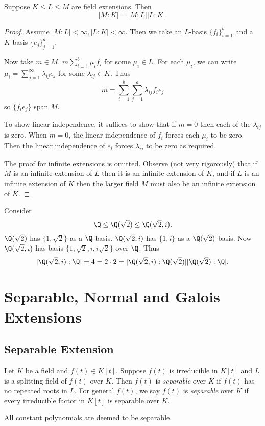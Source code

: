 \documentclass[a4paper]{article}
\begin{document}
\begin{theorem}
  Suppose \(K \leq L \leq M\) are field extensions. Then
  \[
    |M:K| = |M:L||L:K|.
  \]
\end{theorem}

\begin{proof}
  Assume \(|M:L| < \infty, |L:K| < \infty\). Then we take an \(L\)-basis \(\{f_i\}_{i = 1}^b\) and a \(K\)-basis \(\{e_j\}_{j = 1}^a\).

  Now take \(m \in M\). \(m \sum_{i = 1}^{b} \mu_if_i\) for some \(\mu_i \in L\). For each \(\mu_i\), we can write \(\mu_i = \sum_{j = 1}^{\infty} \lambda_{ij}e_j\) for some \(\lambda_{ij} \in K\). Thus
  \[
    m = \sum_{i = 1}^{b} \sum_{j = 1}^{a} \lambda_{ij} f_ie_j
  \]
  so \(\{f_ie_j\}\) span \(M\).

  To show linear independence, it suffices to show that if \(m = 0\) then each of the \(\lambda_{ij}\) is zero. When \(m = 0\), the linear independence of \(f_i\) forces each \(\mu_i\) to be zero. Then the linear independence of \(e_i\) forces \(\lambda_{ij}\) to be zero as required.

  The proof for infinite extensions is omitted. Observe (not very rigorously) that if \(M\) is an infinite extension of \(L\) then it is an infinite extension of \(K\), and if \(L\) is an infinite extension of \(K\) then the larger field \(M\) must also be an infinite extension of \(K\).
\end{proof}

\begin{eg}
  Consider
  \[
    \Q \leq \Q(\sqrt 2) \leq \Q(\sqrt 2, i).
  \]
  \(\Q(\sqrt 2)\) has \(\{1, \sqrt 2\}\) as a \(\Q\)-basis. \(\Q(\sqrt 2, i)\) has \(\{1, i\}\) as a \(\Q(\sqrt 2)\)-basis. Now \(\Q(\sqrt 2, i)\) has basis \(\{1, \sqrt 2, i, i \sqrt 2\}\) over \(\Q\). Thus
  \[
    |\Q(\sqrt 2, i):\Q| = 4 = 2 \cdot 2 = |\Q(\sqrt 2, i):\Q(\sqrt 2)||\Q(\sqrt 2):\Q|.
  \]
\end{eg}

\blindtext

\section{Separable, Normal and Galois Extensions}

\subsection{Separable Extension}

\begin{definition}
  Let \(K\) be a field and \(f(t) \in K[t]\). Suppose \(f(t)\) is irreducible in \(K[t]\) and \(L\) is a splitting field of \(f(t)\) over \(K\). Then \(f(t)\) is \emph{separable} over \(K\) if \(f(t)\) has no repeated roots in \(L\). For general \(f(t)\), we say \(f(t)\) is \emph{separable} over \(K\) if every irreducible factor in \(K[t]\) is separable over \(K\).

  All constant polynomials are deemed to be separable.
\end{definition}
\end{document}
